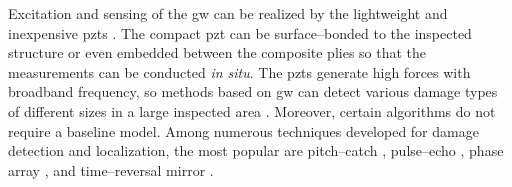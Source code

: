 Excitation and sensing of the \ac{gw} can be realized by the lightweight and inexpensive \acp{pzt} \cite{giurgiutiumicromechatronics}.
The compact \ac{pzt} can be surface--bonded to the inspected structure or even embedded between the composite plies so that the measurements can be conducted \textit{in situ}.
The \acp{pzt} generate high forces with broadband frequency, so methods based on \ac{gw} can detect various damage types of different sizes in a large inspected area \cite{su2006guided}. Moreover, certain algorithms do not require a baseline model.
Among numerous techniques developed for damage detection and localization, the most popular are pitch--catch \cite{ihn2008pitch, sikdar2017structural}, pulse--echo \cite{guo1993interaction, kudela2008damage}, phase array \cite{lu2006crack, ostachowicz2008elastic}, and time--reversal mirror \cite{fink1992time, eremin2016analytically}.
